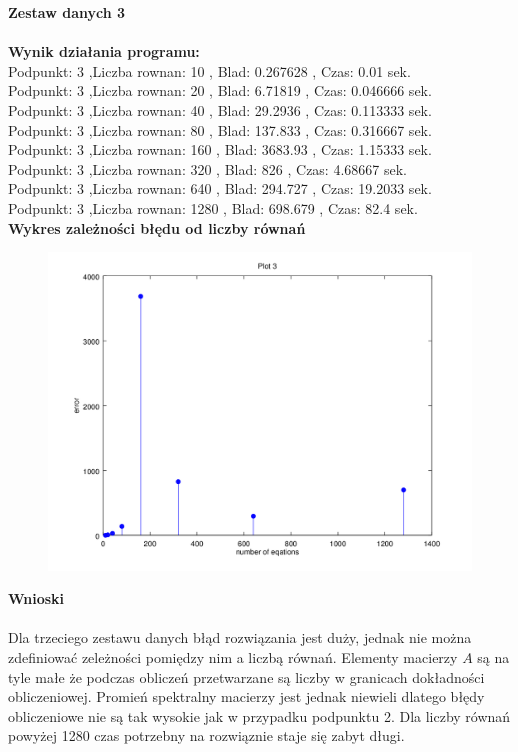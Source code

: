 \documentclass[a4paper, 11pt]{article}
\begin{document}
\vspace{1cm}
\textbf{Zestaw danych 3}\\
\\

\textbf{Wynik działania programu:} \\
Podpunkt: 3 ,Liczba rownan: 10 , Blad: 0.267628 , Czas: 0.01 sek. \\
Podpunkt: 3 ,Liczba rownan: 20 , Blad: 6.71819 , Czas: 0.046666 sek. \\
Podpunkt: 3 ,Liczba rownan: 40 , Blad: 29.2936 , Czas: 0.113333 sek. \\
Podpunkt: 3 ,Liczba rownan: 80 , Blad: 137.833 , Czas: 0.316667 sek. \\
Podpunkt: 3 ,Liczba rownan: 160 , Blad: 3683.93 , Czas: 1.15333 sek. \\
Podpunkt: 3 ,Liczba rownan: 320 , Blad: 826 , Czas: 4.68667 sek. \\
Podpunkt: 3 ,Liczba rownan: 640 , Blad: 294.727 , Czas: 19.2033 sek.\\ 
Podpunkt: 3 ,Liczba rownan: 1280 , Blad: 698.679 , Czas: 82.4 sek. \\


\vspace{1cm}
\textbf{Wykres zależności błędu od liczby równań}\\
\begin{figure}[th]
\includegraphics[width=\textwidth]{wykres3}
\end{figure}

\vspace{1cm}
\textbf{Wnioski}\\
\\
Dla trzeciego zestawu danych błąd rozwiązania jest duży, jednak nie można zdefiniować zeleżności pomiędzy nim a liczbą równań. Elementy macierzy $A$ są na tyle małe że podczas obliczeń przetwarzane są liczby w granicach dokładności obliczeniowej. Promień spektralny macierzy jest jednak niewieli dlatego błędy obliczeniowe nie są tak wysokie jak w przypadku podpunktu 2. Dla liczby równań powyżej 1280 czas potrzebny na rozwiąznie staje się zabyt długi.
\end{document}
